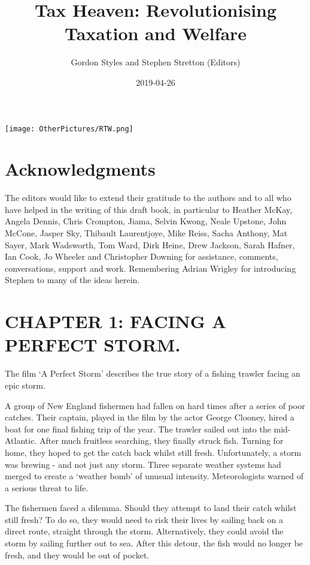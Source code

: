 \documentclass[]{tufte-handout}
\title{Tax Heaven: Revolutionising Taxation and Welfare}
\author{Gordon Styles and Stephen Stretton (Editors)}
\date{2019-04-26}
\begin{document}
\maketitle




\newpage

\texttt{[image: OtherPictures/RTW.png]}

\hypertarget{acknowledgments}{%
\section{Acknowledgments}\label{acknowledgments}}

The editors would like to extend their gratitude to the authors and to
all who have helped in the writing of this draft book, in particular to
Heather McKay, Angela Dennis, Chris Crompton, Jiama, Selvin Kwong, Neale
Upstone, John McCone, Jasper Sky, Thibault Laurentjoye, Mike Reiss,
Sacha Anthony, Mat Sayer, Mark Wadsworth, Tom Ward, Dirk Heine, Drew
Jackson, Sarah Hafner, Ian Cook, Jo Wheeler and Christopher Downing for
assistance, comments, conversations, support and work. Remembering
Adrian Wrigley for introducing Stephen to many of the ideas herein.

\newpage

\hypertarget{chapter-1-facing-a-perfect-storm.}{%
\section{CHAPTER 1: FACING A PERFECT
STORM.}\label{chapter-1-facing-a-perfect-storm.}}

The film `A Perfect Storm' describes the true story of a fishing trawler
facing an epic storm.

A group of New England fishermen had fallen on hard times after a series
of poor catches. Their captain, played in the film by the actor George
Clooney, hired a boat for one final fishing trip of the year. The
trawler sailed out into the mid-Atlantic. After much fruitless
searching, they finally struck fish. Turning for home, they hoped to get
the catch back whilst still fresh. Unfortunately, a storm was brewing -
and not just any storm. Three separate weather systems had merged to
create a `weather bomb' of unusual intensity. Meteorologists warned of a
serious threat to life.

The fishermen faced a dilemma. Should they attempt to land their catch
whilst still fresh? To do so, they would need to risk their lives by
sailing back on a direct route, straight through the storm.
Alternatively, they could avoid the storm by sailing further out to sea.
After this detour, the fish would no longer be fresh, and they would be
out of pocket.
\end{document}
